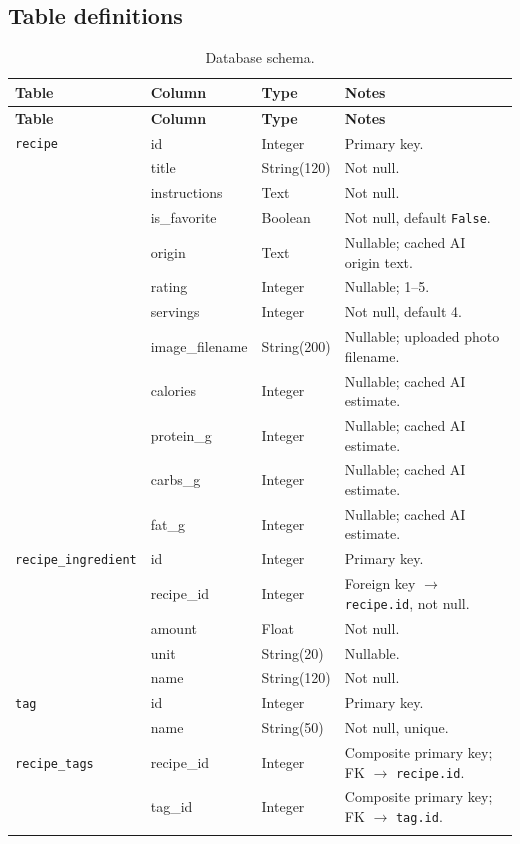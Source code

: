\documentclass[11pt,a4paper]{article}
\newcommand{\code}[1]{\texttt{#1}}
\begin{document}
\subsection{Table definitions}
\begin{longtable}{@{}p{3.4cm}p{3.3cm}p{1.3cm}p{6cm}@{}}
\toprule
\textbf{Table} & \textbf{Column} & \textbf{Type} & \textbf{Notes} \\
\midrule
\endfirsthead
\toprule
\textbf{Table} & \textbf{Column} & \textbf{Type} & \textbf{Notes} \\
\midrule
\endhead
\code{recipe} & id & Integer & Primary key. \\
              & title & String(120) & Not null. \\
              & instructions & Text & Not null. \\
              & is\_favorite & Boolean & Not null, default \code{False}. \\
              & origin & Text & Nullable; cached AI origin text. \\
              & rating & Integer & Nullable; 1--5. \\
              & servings & Integer & Not null, default 4. \\
              & image\_filename & String(200) & Nullable; uploaded photo filename. \\
              & calories & Integer & Nullable; cached AI estimate. \\
              & protein\_g & Integer & Nullable; cached AI estimate. \\
              & carbs\_g & Integer & Nullable; cached AI estimate. \\
              & fat\_g & Integer & Nullable; cached AI estimate. \\
\midrule
\code{recipe\_ingredient} & id & Integer & Primary key. \\
              & recipe\_id & Integer & Foreign key $\rightarrow$ \code{recipe.id}, not null. \\
              & amount & Float & Not null. \\
              & unit & String(20) & Nullable. \\
              & name & String(120) & Not null. \\
\midrule
\code{tag}    & id & Integer & Primary key. \\
              & name & String(50) & Not null, unique. \\
\midrule
\code{recipe\_tags} & recipe\_id & Integer & Composite primary key; FK $\rightarrow$ \code{recipe.id}. \\
              & tag\_id & Integer & Composite primary key; FK $\rightarrow$ \code{tag.id}. \\
\bottomrule
\caption{Database schema.}
\end{longtable}
\end{document}
